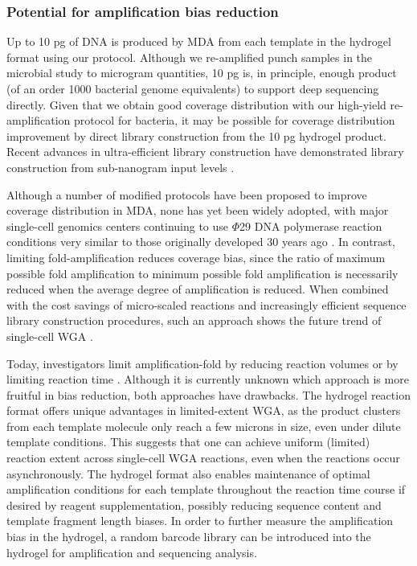 \subsubsection{Potential for amplification bias reduction}
Up to 10 pg of DNA is produced by MDA from each template in the hydrogel format using our protocol. Although we re-amplified punch samples in the microbial study to microgram quantities, 10 pg is, in principle, enough product (of an order 1000 bacterial genome equivalents) to support deep sequencing directly. Given that we obtain good coverage distribution with our high-yield re-amplification protocol for bacteria, it may be possible for coverage distribution improvement by direct library construction from the 10 pg hydrogel product. Recent advances in ultra-efficient library construction have demonstrated library construction from sub-nanogram input levels \cite{White:2009jz}. 

Although a number of modified protocols have been proposed to improve coverage distribution in MDA, none has yet been widely adopted, with major single-cell genomics centers continuing to use $\Phi$29 DNA polymerase reaction conditions very similar to those originally developed 30 years ago \cite{Blanco:1985ul,Allen:2011jn}. In contrast, limiting fold-amplification reduces coverage bias, since the ratio of maximum possible fold amplification to minimum possible fold amplification is necessarily reduced when the average degree of amplification is reduced. When combined with the cost savings of micro-scaled reactions and increasingly efficient sequence library construction procedures, such an approach shows the future trend of single-cell WGA \cite{deBourcy:2014ji}. 

Today, investigators limit amplification-fold by reducing reaction volumes \cite{Marcy:2007ip,Landry:2013dh} or by limiting reaction time \cite{Spits:2006em}. Although it is currently unknown which approach is more fruitful in bias reduction, both approaches have drawbacks. The hydrogel reaction format offers unique advantages in limited-extent WGA, as the product clusters from each template molecule only reach a few microns in size, even under dilute template conditions. This suggests that one can achieve uniform (limited) reaction extent across single-cell WGA reactions, even when the reactions occur asynchronously. The hydrogel format also enables maintenance of optimal amplification conditions for each template throughout the reaction time course if desired by reagent supplementation, possibly reducing sequence content and template fragment length biases. In order to further measure the amplification bias in the hydrogel, a random barcode library can be introduced into the hydrogel for amplification and sequencing analysis. 

